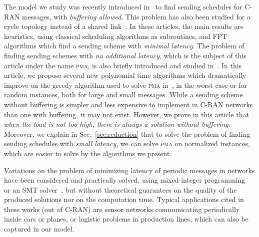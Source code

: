 \documentclass[a4paper,UKenglish,cleveref, autoref, thm-restate]{lipics-v2019}
\newcommand\pma{\textsc{pma}\xspace}
\begin{document}
The model we study was recently introduced in~\cite{barth2018deterministic,bartharxiv2018deterministic} to find sending schedules for C-RAN messages, with \emph{buffering allowed}. This problem has also been studied for a cycle topology instead of a shared link~\cite{Guir1905:Deterministic}. In these articles, the main results are heuristics, using classical scheduling algorithms as subroutines, and FPT algorithms which find a sending scheme with \emph{minimal latency}. The problem of finding sending schemes with \emph{no additional latency}, which is the subject of this article under the name \pma, is also briefly introduced and studied in~\cite{bartharxiv2018deterministic}.
In this article, we propose several new polynomial time algorithms which dramatically improve on the greedy algorithm used to solve \pma in~\cite{bartharxiv2018deterministic}, in the worst case or for random instances, both for large and small messages. 
While a sending scheme without buffering is simpler and less expensive to implement in C-RAN networks than one with buffering, it may not exist. However, we prove in this article that \emph{when the load is not too high, there is always a solution without buffering}. Moreover, we explain in Sec.~\ref{sec:reduction} that to solve the problem of finding sending schedules with \emph{small latency}, we can solve \pma on normalized instances, which are easier to solve by the algorithms we present.

 Variations on the problem of minimizing latency of periodic messages in networks have been considered and practically solved, using mixed-integer programming~\cite{nayak2017incremental,steiner2018traffic} or an SMT solver~\cite{dos2019tsnsched}, but without theoretical guarantees on the quality of the produced solutions nor on the computation time. Typical applications cited in these works (out of C-RAN) are sensor networks communicating periodically inside cars or planes, or logistic problems in production lines, which can also be captured in our model.
\end{document}
